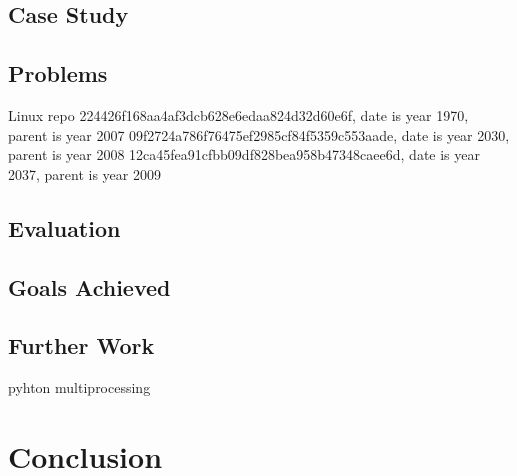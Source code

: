 \documentclass[12pt, a4paper]{report}
\begin{document}
\section{Case Study}

\section{Problems}
Linux repo
224426f168aa4af3dcb628e6edaa824d32d60e6f, date is year 1970, parent is year 2007
09f2724a786f76475ef2985cf84f5359c553aade, date is year 2030, parent is year 2008
12ca45fea91cfbb09df828bea958b47348caee6d, date is year 2037, parent is year 2009

\section{Evaluation}

\section{Goals Achieved}

\section{Further Work}
pyhton multiprocessing

\chapter{Conclusion}

\printglossary[type=\acronymtype]
\printbibliography[heading=bibintoc]
\end{document}
